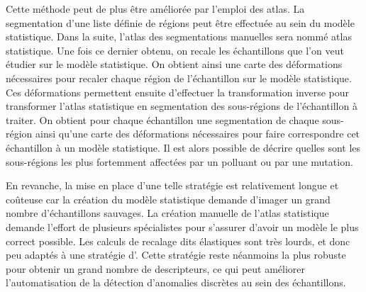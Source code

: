 \documentclass[\main/main.tex]{subfiles}
\begin{document}
%
Cette méthode peut de plus être améliorée par l'emploi des atlas. La segmentation d'une liste définie de régions peut être effectuée au sein du modèle statistique. Dans la suite, l'atlas des segmentations manuelles sera nommé atlas statistique.
Une fois ce dernier obtenu, on recale les échantillons que l'on veut étudier sur le modèle statistique. On obtient ainsi une carte des déformations nécessaires pour recaler chaque région de l'échantillon sur le modèle statistique. Ces déformations permettent ensuite d'effectuer la transformation inverse pour transformer l'atlas statistique en segmentation des sous-régions de l'échantillon à traiter.
On obtient pour chaque échantillon une segmentation de chaque sous-région ainsi qu'une carte des déformations nécessaires pour faire correspondre cet échantillon à un modèle statistique.
Il est alors possible de décrire quelles sont les sous-régions les plus fortemment affectées par un polluant ou par une mutation.

En revanche, la mise en place d'une telle stratégie est relativement longue et coûteuse car la création du modèle statistique demande d'imager un grand nombre d'échantillons sauvages. La création manuelle de l'atlas statistique demande l'effort de plusieurs spécialistes pour s'assurer d'avoir un modèle le plus correct possible. Les calculs de recalage dits élastiques sont très lourds, et donc peu adaptés à une stratégie d'\hta. 
Cette stratégie reste néanmoins la plus robuste  pour obtenir un grand nombre de descripteurs,  ce qui peut améliorer l'automatisation de la détection d'anomalies discrètes au sein des échantillons.
\end{document}

